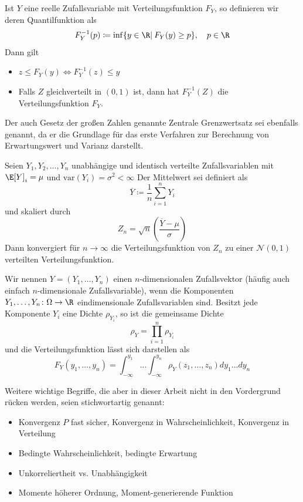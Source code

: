 \begin{maththeorem}[Inversionsmethode]
\label{thinversionsmethode}
Ist $Y$ eine reelle Zufallsvariable mit Verteilungsfunktion $F_Y$, so definieren wir deren Quantilfunktion als
\[F_Y^{-1}(p)\coloneqq \inf\lbrace y\in\R |\: F_Y(y)\ge p\rbrace,\quad p\in\R\]
Dann gilt
\begin{itemize}
\item $z\le F_Y(y)\iff F_Y^{-1}(z)\le y$\\
\item Falls $Z$ gleichverteilt in $(0,1)$ ist, dann hat $F_Y^{-1}(Z)$ die Verteilungsfunktion $F_Y$. 
\end{itemize}
\end{maththeorem}
Der auch Gesetz der großen Zahlen genannte Zentrale Grenzwertsatz sei ebenfalls genannt, da er die Grundlage für das erste Verfahren zur Berechnung von Erwartungswert und Varianz darstellt.
\begin{maththeorem}
\label{thzentralgrenzwert}
Seien $Y_1,Y_2,\dots,Y_n$ unabhängige und identisch verteilte Zufallsvariablen mit $\E[Y]_i=\mu$ und $\text{var}(Y_i)=\sigma^2<\infty$ Der Mittelwert sei definiert als
\[\overline{Y}\coloneqq \frac{1}{n}\sum_{i=1}^nY_i\]
und skaliert durch
\[Z_n=\sqrt{n}\left(\frac{\overline{Y}-\mu}{\sigma}\right)\]
Dann konvergiert für $n\to\infty$ die Verteilungsfunktion von $Z_n$ zu einer $\mathcal{N}(0,1)$ verteilten Verteilungsfunktion.
\end{maththeorem}
\begin{mathdef}[Zufallsvektoren]
Wir nennen $Y=(Y_1,\dots,Y_n)$ einen $n$-dimensionalen Zufallsvektor (häufig auch einfach $n$-dimensionale Zufallsvariable), wenn die Komponenten $Y_1,\dots,Y_n\colon\Omega\to\R$ eindimensionale Zufallsvariablen sind. Besitzt jede Komponente $Y_i$ eine Dichte $\rho_{Y_i}$, so ist die gemeinsame Dichte
\[\rho_Y=\prod_{i=1}^n \rho_{Y_i}\]
und die Verteilungsfunktion lässt sich darstellen als
\[F_Y(y_1,\dots,y_n)=\int_{-\infty}^{y_1}\dots\int_{-\infty}^{y_n}\rho_Y(z_1,\dots,z_n)dy_1\dots dy_n\]
\end{mathdef}
Weitere wichtige Begriffe, die aber in dieser Arbeit nicht in den Vordergrund rücken werden, seien stichwortartig genannt:
\begin{itemize}
\item Konvergenz $P$ fast sicher, Konvergenz in Wahrscheinlichkeit, Konvergenz in Verteilung\\
\item Bedingte Wahrscheinlichkeit, bedingte Erwartung
\item Unkorreliertheit vs. Unabhängigkeit
\item Momente höherer Ordnung, Moment-generierende Funktion
\end{itemize}

